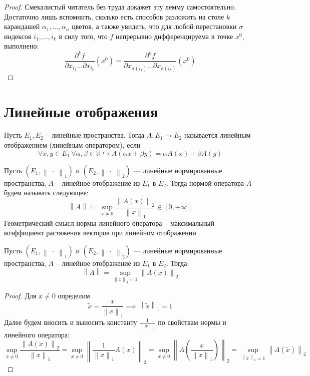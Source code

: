 \documentclass[11pt]{article}
\begin{document}
\begin{proof}
    Смекалистый читатель без труда докажет эту лемму самостоятельно. Достаточно лишь вспомнить, сколько 
    есть способов разложить на столе $k$ карандашей $\alpha_1, \ldots, \alpha_n$ цветов, а также увидеть, что 
    для любой перестановки $\sigma$ индексов $i_1, \ldots, i_k$ в силу того, что $f$ непрерывно дифференцируема в точке $x^0$, выполнено: 
    \[\frac{\partial^k f}{\partial x_{i_1} \dots \partial x_{i_k}}(x^0) = 
    \frac{\partial^k f}{\partial x_{\sigma(i_1)} \dots \partial x_{\sigma(i_k)}}(x^0)\]
\end{proof}

\section{Линейные отображения}

\begin{definition}
    Пусть $E_1, E_2$ -- линейные пространства. Тогда $A \colon E_1 \to E_2$ называется 
    линейным отображением (линейным оператором), если \[\forall x, y \in E_1 \ \forall 
    \alpha, \beta \in \mathbb{R} \hookrightarrow A(\alpha x + \beta y) = \alpha A(x) + \beta A(y)\]
\end{definition}

\begin{definition}
    Пусть $(E_1, \left\lVert \; \cdot \; \right\rVert_1)$ и $(E_2, \left\lVert \; \cdot \;
    \right\rVert_2)$ --- линейные нормированные пространства, $A$ -- линейное отображение из $E_1$ в $E_2$. Тогда 
    нормой оператора $A$ будем называть следующее: \[\left\lVert A \right\rVert := \sup_{x \neq 0} 
    \frac{\left\lVert A(x) \right\rVert_2}{\left\lVert x \right\rVert_1} \in [0, +\infty]\] 
    Геометрический смысл нормы линейного оператора -- максимальный коэффициент растяжения векторов при линейном 
    отображении.
\end{definition}

\begin{lemma}
    Пусть $(E_1, \left\lVert \; \cdot \; \right\rVert_1)$ и $(E_2, \left\lVert \; \cdot \;
    \right\rVert_2)$ --- линейные нормированные пространства, $A$ -- линейное отображение из $E_1$ в $E_2$. Тогда:
    \[\left\lVert A 
    \right\rVert = \sup_{\left\lVert x \right\rVert_1 = 1} \left\lVert A(x) \right\rVert_2\]
\end{lemma}

\begin{proof}
    Для $x \neq 0$ определим \[\widetilde{x} = \frac{x}{\left\lVert x \right\rVert_1} 
    \implies \left\lVert \widetilde{x} \right\rVert_1 = 1\]
    Далее будем вносить и выносить константу $\frac{1}{\left\lVert x \right\rVert_1}$ по свойствам нормы и линейного оператора: 
    \[\sup_{x \neq 0} \frac{\left\lVert A(x) \right\rVert_2}{\left\lVert x 
    \right\rVert_1} = \sup_{x \neq 0} \left\lVert \frac{1}{\left\lVert x \right\rVert_1} 
    A(x) \right\rVert_2 = \sup_{x \neq 0} \left\lVert A\left(\frac{x}{\left\lVert x 
    \right\rVert_1}\right) \right\rVert_2 = \sup_{\left\lVert \widetilde{x} 
    \right\rVert_1 = 1} \left\lVert A(\widetilde{x}) \right\rVert_2\]
\end{proof}
\end{document}
